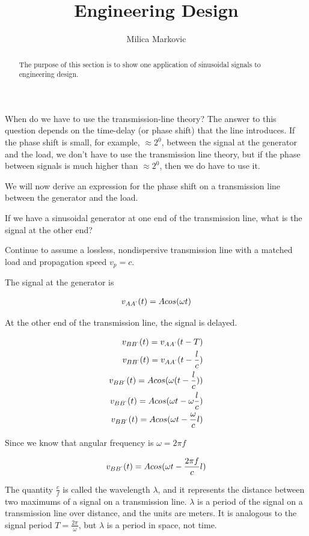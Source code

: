 \documentclass{ximera}
\title{Engineering Design}
\author{Milica Markovic}
\begin{document}
  
\begin{abstract}  
The purpose of this section is to show one application of sinusoidal signals to engineering design.
\end{abstract}  
\maketitle

When do we have to use the transmission-line theory? The answer to this question depends on the time-delay (or phase shift) that the line introduces. If the phase shift is small, for example, $\approx 2^0$, between the signal at the generator and the load, we don't have to use the transmission line theory, but if the phase between signals is much higher than  $\approx 2^0$, then we do have to use it.

We will now derive an expression for the phase shift on a transmission line between the generator and the load.

If we have a sinusoidal generator at one end of the transmission line, what is the signal at the other end?

Continue to assume a lossless, nondispersive transmission line
with a matched load and propagation speed $v_p=c$.

The signal at the generator is 

\begin{eqnarray}
v_{AA^`}(t)=A cos(\omega t)
\end{eqnarray}

At the other end of the transmission line, the signal is delayed.


\begin{eqnarray}
v_{BB^`}(t)=v_{AA^`}(t-T) \\
v_{BB^`}(t)=v_{AA^`}(t-\frac{l}{c}) \\
v_{BB^`}(t)=A cos(\omega (t - \frac{l}{c}))  \\
v_{BB^`}(t)=A cos(\omega t - \omega \frac{l}{c}) \\
v_{BB^`}(t)=A cos(\omega t -  \frac{\omega }{c} l) 
\end{eqnarray}

Since we know that angular frequency is  $\omega = 2 \pi f$


\begin{eqnarray}
v_{BB^`}(t)=A cos(\omega t -  \frac{ 2 \pi f }{c} l)
\end{eqnarray}

The quantity $\frac{c}{f}$ is called the wavelength $\lambda$, and it represents the distance between two maximums of a signal on a transmission line.  $\lambda$ is a period of the signal on a transmission line over distance, and the units are meters. 
It is analogous to the signal period $T=\frac{2 \pi}{\omega}$, but $\lambda$ is a period in space, not time.
\end{document}
